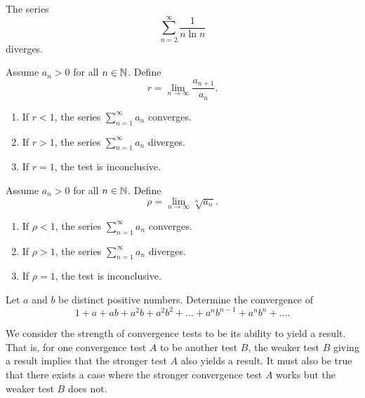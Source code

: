 \begin{example}
  The series
  \[ \sum_{n = 2}^{\infty} \frac{1}{n \ln n} \]
  diverges.
\end{example}

\begin{proposition}
  Assume $a_n > 0$ for all $n \in \mathbb N$. Define
  \[ r = \lim_{n \to \infty} \frac{a_{n + 1}}{a_n}. \]
  \begin{enumerate}
    \item If $r < 1$, the series $\sum_{n = 1}^{\infty} a_n$ converges.
    \item If $r > 1$, the series $\sum_{n = 1}^{\infty} a_n$ diverges.
    \item If $r = 1$, the test is inconclusive.
  \end{enumerate}
\end{proposition}

\begin{proposition}
  Assume $a_n > 0$ for all $n \in \mathbb N$. Define
  \[ \rho = \lim_{n \to \infty} \sqrt[n]{a_n}. \]
  \begin{enumerate}
    \item If $\rho < 1$, the series $\sum_{n = 1}^{\infty} a_n$ converges.
    \item If $\rho > 1$, the series $\sum_{n = 1}^{\infty} a_n$ diverges.
    \item If $\rho = 1$, the test is inconclusive.
  \end{enumerate}
\end{proposition}

\begin{example}
  Let $a$ and $b$ be distinct positive numbers. Determine the convergence of
  \[ 1 + a + ab + a^2b + a^2b^2 + \dots + a^nb^{n - 1} + a^nb^n + \dots. \]
\end{example}

\begin{definition}
  We consider the strength of convergence tests to be its ability to
  yield a result. That is, for one convergence test $A$ to be
   another test $B$, the weaker test $B$
  giving a result implies that the stronger test $A$ also yields a
  result. It must also be true that there exists a case where the
  stronger convergence test $A$ works but the weaker test $B$ does not.
\end{definition}

